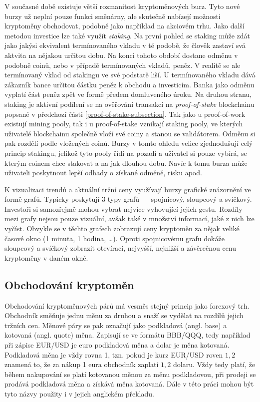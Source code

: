 V současné době existuje větší rozmanitost kryptoměnových burz. Tyto nové burzy už neplní pouze funkci směnárny, ale skutečně nabízejí možnosti
kryptoměny obchodovat, podobně jako například na akciovém trhu. Jako další metodou investice lze také využít \emph{staking}. Na první pohled se staking
může zdát jako jakýsi ekvivalent termínovaného vkladu v té podobě, že člověk zastaví svá aktvita na nějakou určitou dobu. Na konci tohoto období dostane
odměnu v podobně coinů, nebo v případě termínovaných vkladů, peněz. V realitě se ale termínovaný vklad od stakingu ve své podstatě liší. U termínovaného
vkladu dává zákazník bance určitou částku peněz k obchodu a investicím. Banka jako odměnu vyplatí část peněz zpět ve formě předem domluveného úroku.
Na druhou stranu, staking je aktivní podílení se na ověřování transakcí na \emph{proof-of-stake} blockchainu popsané v předchozí části
\ref{proof-of-stake-subsection}. Tak jako u proof-of-work existují mining pooly, tak i u proof-of-stake vznikají staking pooly, ve kterých uživatelé
blockchainu společně vloží své coiny a stanou se validátorem. Odměnu si pak rozdělí podle vložených coinů. Burzy v tomto ohledu velice zjednodušují
celý princip stakingu, jelikož tyto pooly řídí na pozadí a uživatel si pouze vybírá, se kterým coinem chce stakovat a na jak dlouhou dobu. Navíc k tomu
burza může uživateli poskytnout lepší odhady o získané odměně, risku apod.

K vizualizaci trendů a aktuální tržní ceny využívají burzy grafické znázornění ve formě grafů. Typicky poskytují 3 typy grafů --- spojnicový, sloupcový a svíčkový.
Investoři si samozřejmě mohou vybrat nejvíce vyhovující jejich gestu. Rozdíly mezi grafy nejsou pouze vizuální, avšak také v množství informací, jaké z nich lze vyčíst.
Obvykle se v těchto grafech zobrazují ceny kryptoměn za nějak veliké časové okno (1 minuta, 1 hodina, \ldots). Oproti spojnicovému grafu dokáže sloupcový a svíčkový
zobrazit otevírací, nejvyšší, nejnižší a závěrečnou cenu kryptoměny v daném okně.

\subsection{Obchodování kryptoměn}
Obchodování kryptoměnových párů má vesměs stejný princip jako forexový trh. Obchodník směňuje jednu měnu za druhou a snaží se vydělat na rozdílů jejich tržních cen.
Měnové páry se pak označují jako podkladová (angl. base) a kotovaná (angl. quote) měna. Zapisují se ve formátu {BBB/QQQ}, tedy například při zápise
EUR/USD je euro podkladová měna a dolar je měna kotovaná. Podkladová měna je vždy rovna 1, tzn. pokud je kurz EUR/USD roven $1,2$ znamená to, že za nákup 1 eura
obchodník zaplatí $1,2$ dolaru. Vždy tedy platí, že během nakupování se platí kotovanou měnou za měnu podkladovou, při prodeji se prodává podkladová měna a získává
měna kotovaná. Dále v této práci mohou být tyto názvy použity i v jejich anglickém překladu.

